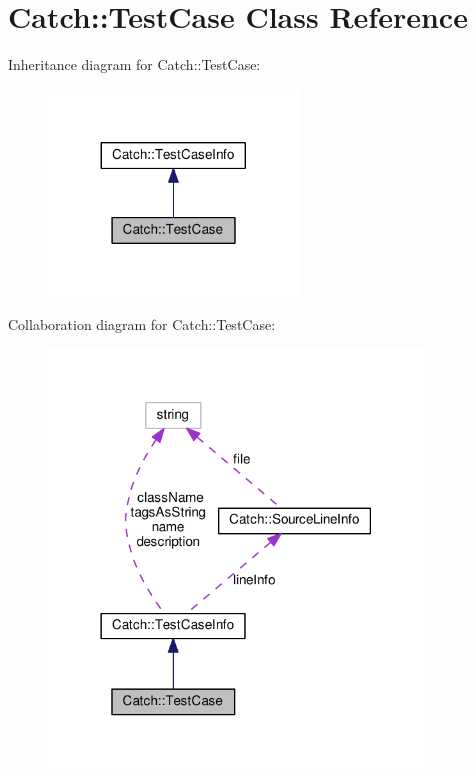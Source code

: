 \hypertarget{classCatch_1_1TestCase}{}\section{Catch\+:\+:Test\+Case Class Reference}
\label{classCatch_1_1TestCase}


Inheritance diagram for Catch\+:\+:Test\+Case\+:
\nopagebreak
\begin{figure}[H]
\begin{center}
\leavevmode
\includegraphics[width=188pt]{classCatch_1_1TestCase__inherit__graph}
\end{center}
\end{figure}


Collaboration diagram for Catch\+:\+:Test\+Case\+:
\nopagebreak
\begin{figure}[H]
\begin{center}
\leavevmode
\includegraphics[width=282pt]{classCatch_1_1TestCase__coll__graph}
\end{center}
\end{figure}
